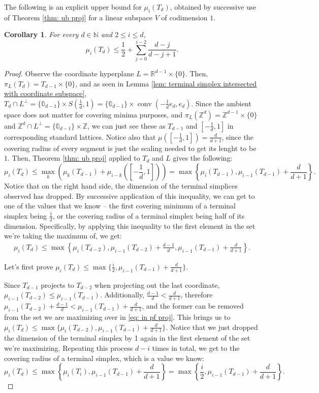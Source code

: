 \documentclass{amsart}
\newtheorem{corollary}[theorem]{Corollary}
\theoremstyle{definition}
\theoremstyle{remark}
\newcommand{\R}{\mathbb{R}}
\newcommand{\N}{\mathbb{N}}
\newcommand{\Z}{\mathbb{Z}}
\begin{document}
The following is an explicit upper bound for $\mu_i(T_d)$, obtained by successive use of Theorem \ref{thm: ub proj} for a linear subspace $V$ of codimension $1$.






\begin{corollary}\label{cor: UB proj terminal simplex}
For every $d\in \N$ and $2\leqslant i \leqslant d$, 
$$\mu_i(T_d)\leqslant\frac{1}{2}+\sum\limits_{j=0}^{i-2} \frac{d-j}{d-j+1}.$$
\end{corollary}
\begin{proof}
Observe the coordinate hyperplane $L=\R^{d-1}\times \{0\}$. Then, $\pi_L(T_d)=T_{d-1}\times \{ 0\}$, and as seen in Lemma  \ref{lem: terminal simplex intersected with coordinate subspace}, $T_d\cap L^\perp = \{ \mathbb{0}_{d-1}\}\times S(\frac{1}{d}, 1)=\{ \mathbb{0}_{d-1}\}\times \operatorname{conv}(-\frac{1}{d}e_d, e_d)$. Since the ambient space does not matter for covering minima purposes, and $\pi_L(\Z^d)=\Z^{d-1}\times\{0\}$ and $\Z^d\cap L^\perp=\{\mathbb{0}_{d-1}\}\times \Z$, we can just see these as $T_{d-1}$ and $[-\frac{1}{d}, 1]$ in corresponding standard lattices. Notice also that $\mu([-\frac{1}{d}, 1])=\frac{d}{d+1}$, since the covering radius of every segment is just the scaling needed to get its lenght to be $1$. Then, Theorem \ref{thm: ub proj} applied to $T_d$ and $L$ gives the following:
$$\mu_i(T_d)\leqslant \max_k \left (\mu_k(T_{d-1})+\mu_{i-k}([-\frac{1}{d}, 1])\right)=\max \left\{ \mu_i(T_{d-1}), \mu_{i-1}(T_{d-1})+\frac{d}{d+1}\right\}. $$
Notice that on the right hand side, the dimension of the terminal simplices observed has dropped.
By successive application of this inequality, we can get to one of the values that we know -- the first covering minimum of a terminal simplex being $\frac{1}{2}$, or the covering radius of a terminal simplex being half of its dimension. Specifically, by applying this inequality to the first element in the set we're taking the maximum of, we get:
\begin{align} \label{eq: in pf proj}
\mu_i(T_d)\leqslant \max \left\{ \mu_i(T_{d-2}), \mu_{i-1}(T_{d-2})+\frac{d-1}{d}, \mu_{i-1}(T_{d-1})+\frac{d}{d+1}\right\}.
\end{align}

 Let's first prove $\mu_i(T_d)\leqslant \max \{\frac{i}{2}, \mu_{i-1}(T_{d-1})+\frac{d}{d+1}\}$. 

Since $T_{d-1}$ projects to $T_{d-2}$ when projecting out the last coordinate, $\mu_{i-1}(T_{d-2})\leqslant \mu_{i-1}(T_{d-1}).$ Additionally, $\frac{d-1}{d}<\frac{d}{d+1}$, therefore $\mu_{i-1}(T_{d-2})+\frac{d-1}{d}<\mu_{i-1}(T_{d-1})+\frac{d}{d+1}$, and the former can be removed from the set we are maximizing over in \eqref{eq: in pf proj}. This brings us to
 $\mu_i(T_d)\leqslant \max \{ \mu_i(T_{d-2}), \mu_{i-1}(T_{d-1})+\frac{d}{d+1}\}$. Notice that we just dropped the dimension of the terminal simplex by 1 again in the first element of the set we're maximizing. Repeating this process $d-i$ times in total, we get to the covering radius of a terminal simplex, which is a value we know:
$$\mu_i(T_d)\leqslant \max \left\{ \mu_i(T_i), \mu_{i-1}(T_{d-1})+\frac{d}{d+1}\right\}=\max \left\{ \frac{i}{2}, \mu_{i-1}(T_{d-1})+\frac{d}{d+1}\right\}.$$ 


\end{proof}
\end{document}
